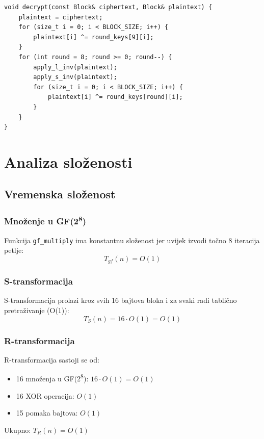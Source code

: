 \documentclass[12pt,a4paper]{article}
\begin{document}
\begin{lstlisting}[style=cpp, caption={Funkcija dešifriranja}, label={lst:decrypt}]
void decrypt(const Block& ciphertext, Block& plaintext) {
    plaintext = ciphertext;
    for (size_t i = 0; i < BLOCK_SIZE; i++) {
        plaintext[i] ^= round_keys[9][i];
    }
    for (int round = 8; round >= 0; round--) {
        apply_l_inv(plaintext);
        apply_s_inv(plaintext);
        for (size_t i = 0; i < BLOCK_SIZE; i++) {
            plaintext[i] ^= round_keys[round][i];
        }
    }
}
\end{lstlisting}

\newpage
\section{Analiza složenosti}

\subsection{Vremenska složenost}

\subsubsection{Množenje u GF(2\textsuperscript{8})}

Funkcija \texttt{gf\_multiply} ima konstantnu složenost jer uvijek izvodi točno 8 iteracija petlje:
\begin{equation}
    T_{gf}(n) = O(1)
\end{equation}

\subsubsection{S-transformacija}

S-transformacija prolazi kroz svih 16 bajtova bloka i za svaki radi tablično pretraživanje (O(1)):
\begin{equation}
    T_S(n) = 16 \cdot O(1) = O(1)
\end{equation}

\subsubsection{R-transformacija}

R-transformacija sastoji se od:
\begin{itemize}
    \item 16 množenja u GF(2\textsuperscript{8}): $16 \cdot O(1) = O(1)$
    \item 16 XOR operacija: $O(1)$
    \item 15 pomaka bajtova: $O(1)$
\end{itemize}
Ukupno: $T_R(n) = O(1)$
\end{document}
